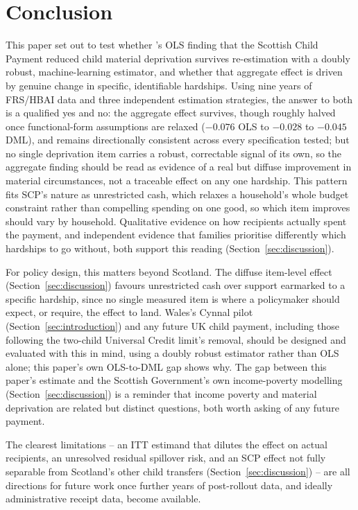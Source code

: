 \section{Conclusion}
\label{sec:conclusion}

This paper set out to test whether \citet{andersen2025}'s OLS finding that the Scottish Child Payment reduced child material deprivation survives re-estimation with a doubly robust, machine-learning estimator, and whether that aggregate effect is driven by genuine change in specific, identifiable hardships. Using nine years of FRS/HBAI data and three independent estimation strategies, the answer to both is a qualified yes and no: the aggregate effect survives, though roughly halved once functional-form assumptions are relaxed ($-0.076$ OLS to $-0.028$ to $-0.045$ DML), and remains directionally consistent across every specification tested; but no single deprivation item carries a robust, correctable signal of its own, so the aggregate finding should be read as evidence of a real but diffuse improvement in material circumstances, not a traceable effect on any one hardship. This pattern fits SCP's nature as unrestricted cash, which relaxes a household's whole budget constraint rather than compelling spending on one good, so which item improves should vary by household. Qualitative evidence on how recipients actually spent the payment, and independent evidence that families prioritise differently which hardships to go without, both support this reading (Section~\ref{sec:discussion}).

For policy design, this matters beyond Scotland. The diffuse item-level effect (Section~\ref{sec:discussion}) favours unrestricted cash over support earmarked to a specific hardship, since no single measured item is where a policymaker should expect, or require, the effect to land. Wales's Cynnal pilot (Section~\ref{sec:introduction}) and any future UK child payment, including those following the two-child Universal Credit limit's removal, should be designed and evaluated with this in mind, using a doubly robust estimator rather than OLS alone; this paper's own OLS-to-DML gap shows why. The gap between this paper's estimate and the Scottish Government's own income-poverty modelling (Section~\ref{sec:discussion}) is a reminder that income poverty and material deprivation are related but distinct questions, both worth asking of any future payment.

The clearest limitations -- an ITT estimand that dilutes the effect on actual recipients, an unresolved residual spillover risk, and an SCP effect not fully separable from Scotland's other child transfers (Section~\ref{sec:discussion}) -- are all directions for future work once further years of post-rollout data, and ideally administrative receipt data, become available.

